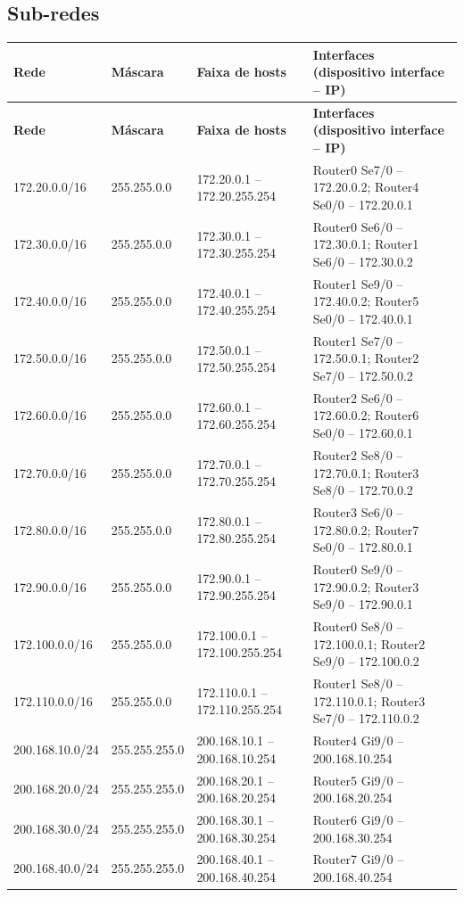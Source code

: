 \subsection{Sub-redes}
\begingroup\scriptsize\setlength{\tabcolsep}{3pt}
\begin{longtable}{@{}p{}p{}p{}p{}@{}}
\toprule \textbf{Rede} & \textbf{Máscara} & \textbf{Faixa de hosts} & \textbf{Interfaces (dispositivo interface – IP)} \\\midrule\endfirsthead
\toprule \textbf{Rede} & \textbf{Máscara} & \textbf{Faixa de hosts} & \textbf{Interfaces (dispositivo interface – IP)} \\\midrule\endhead
172.20.0.0/16 & 255.255.0.0 & 172.20.0.1 – 172.20.255.254 & Router0 Se7/0 – 172.20.0.2; Router4 Se0/0 – 172.20.0.1 \\
172.30.0.0/16 & 255.255.0.0 & 172.30.0.1 – 172.30.255.254 & Router0 Se6/0 – 172.30.0.1; Router1 Se6/0 – 172.30.0.2 \\
172.40.0.0/16 & 255.255.0.0 & 172.40.0.1 – 172.40.255.254 & Router1 Se9/0 – 172.40.0.2; Router5 Se0/0 – 172.40.0.1 \\
172.50.0.0/16 & 255.255.0.0 & 172.50.0.1 – 172.50.255.254 & Router1 Se7/0 – 172.50.0.1; Router2 Se7/0 – 172.50.0.2 \\
172.60.0.0/16 & 255.255.0.0 & 172.60.0.1 – 172.60.255.254 & Router2 Se6/0 – 172.60.0.2; Router6 Se0/0 – 172.60.0.1 \\
172.70.0.0/16 & 255.255.0.0 & 172.70.0.1 – 172.70.255.254 & Router2 Se8/0 – 172.70.0.1; Router3 Se8/0 – 172.70.0.2 \\
172.80.0.0/16 & 255.255.0.0 & 172.80.0.1 – 172.80.255.254 & Router3 Se6/0 – 172.80.0.2; Router7 Se0/0 – 172.80.0.1 \\
172.90.0.0/16 & 255.255.0.0 & 172.90.0.1 – 172.90.255.254 & Router0 Se9/0 – 172.90.0.2; Router3 Se9/0 – 172.90.0.1 \\
172.100.0.0/16 & 255.255.0.0 & 172.100.0.1 – 172.100.255.254 & Router0 Se8/0 – 172.100.0.1; Router2 Se9/0 – 172.100.0.2 \\
172.110.0.0/16 & 255.255.0.0 & 172.110.0.1 – 172.110.255.254 & Router1 Se8/0 – 172.110.0.1; Router3 Se7/0 – 172.110.0.2 \\
200.168.10.0/24 & 255.255.255.0 & 200.168.10.1 – 200.168.10.254 & Router4 Gi9/0 – 200.168.10.254 \\
200.168.20.0/24 & 255.255.255.0 & 200.168.20.1 – 200.168.20.254 & Router5 Gi9/0 – 200.168.20.254 \\
200.168.30.0/24 & 255.255.255.0 & 200.168.30.1 – 200.168.30.254 & Router6 Gi9/0 – 200.168.30.254 \\
200.168.40.0/24 & 255.255.255.0 & 200.168.40.1 – 200.168.40.254 & Router7 Gi9/0 – 200.168.40.254 \\
\bottomrule
\end{longtable}\endgroup

